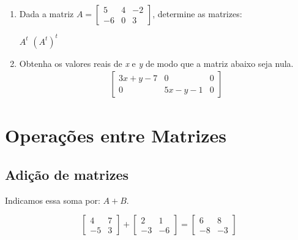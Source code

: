 \begin{enumerate}[label*=\protect\fbox{\arabic{enumi}}]
	\item {
	      Dada a matriz $A = \begin{bmatrix}
			      5  & 4 & -2 \\
			      -6 & 0 & 3
		      \end{bmatrix}$,
	      determine as matrizes:
	      \begin{tasks}
		      \task $A^t$
		      \task $(A^t)^t$
	      \end{tasks}
	      }

	\item {
	      Obtenha os valores reais de \textit{x} e \textit{y} de modo que a matriz abaixo seja nula.
	      \begin{equation*}
		      \begin{split}
			      \begin{bmatrix}
				      3x + y - 7 & 0          & 0 \\
				      0          & 5x - y - 1 & 0
			      \end{bmatrix}
		      \end{split}
	      \end{equation*}
	      }
\end{enumerate}


\section{Operações entre Matrizes}

\subsection{Adição de matrizes}


Indicamos essa soma por: $A + B$.
\begin{example}
	\begin{equation*}
		\begin{bmatrix}
			4  & 7 \\
			-5 & 3
		\end{bmatrix}
		+ \begin{bmatrix}
			2  & 1  \\
			-3 & -6
		\end{bmatrix}
		= \begin{bmatrix}
			6  & 8  \\
			-8 & -3
		\end{bmatrix}
	\end{equation*}
\end{example}

